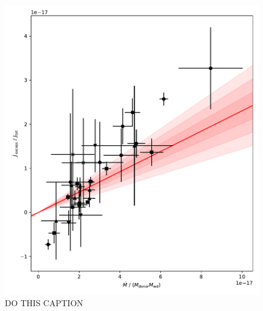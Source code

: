 \begin{figure}
    \centering
    \includegraphics[width=\textwidth]{figures/results/Mdot/eCAML_nu_no_intercept_fit.pdf}
    \caption{DO THIS CAPTION}
    \label{fig:discussion:calibrating ecaml relationship}
\end{figure}

